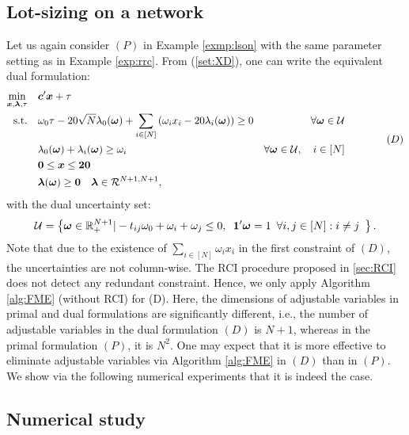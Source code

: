 \documentclass[fleqn,orsc,blindrev]{informs4}
\newcommand{\mb}[1]{\mbox{\boldmath \ensuremath{#1}}}
\begin{document}
		\subsection{Lot-sizing on a network} \label{sec:lsonproblem}
		
		Let us again consider $(P)$ in Example \ref{exmp:lson} with the same parameter setting as in Example \ref{exp:rrc}. From (\ref{set:XD}), one can write the equivalent dual formulation:
\begin{equation*}%
			\begin{aligned} 
				\min_{ \boldsymbol{x} ,\boldsymbol{\lambda}, \tau} \quad &  \mb{c}'\mb{x} + \tau \\
				{\rm s.t.}  \quad & \omega_0\tau - 20\sqrt{N}\lambda_0(\mb{\omega}) + \sum_{i\in [N]}  \left(  \omega_i x_i - 20\lambda_i(\mb{\omega})  \right)  \ge 0   & \forall \mb{\omega} \in \mathcal{U} \\
				\quad & \lambda_0(\mb{\omega}) + \lambda_i (\mb{\omega})\ge \omega_i & \forall \mb{\omega} \in \mathcal{U}, \quad i \in [N]\\
				\quad &   \mb{0}\le \mb{x} \le \mb{20}\\
				\quad & \boldsymbol{\lambda}(\mb{\omega}) \ge \mb{0}	\quad  \mb{\lambda} \in \mathcal{R}^{N+1,N+1},
			\end{aligned} \qquad \qquad (D)
\end{equation*}
		with the dual uncertainty set:
\begin{equation*}
		\mathcal{U}=\left\{ \mb{\omega} \in \mathbb{R}^{N+1}_+| -t_{ij}\omega_0 + \omega_i + \omega_j \le 0, \,\,\, \boldsymbol{1}'\boldsymbol{\omega} = 1 \,\,\, \forall i,j \in [N]: i\ne j \,\,\, \right\}.
\end{equation*}
		Note that due to the existence of  $\sum_{i\in [N]} \omega_i x_i$ in the first constraint of $(D)$, the uncertainties are not column-wise. The RCI procedure proposed in \textsection \ref{sec:RCI} does not detect any redundant constraint. Hence, we only apply Algorithm \ref{alg:FME} (without RCI) for (D). Here, the dimensions of adjustable variables in primal and dual formulations are significantly different, i.e., the number of adjustable variables in the dual formulation $(D)$ is $N+1$, whereas in the primal formulation $(P)$, it is $N^2$. One may expect that it is more effective to eliminate adjustable variables via Algorithm \ref{alg:FME} in $(D)$ than in  $(P)$. We show via the following numerical experiments that it is indeed the case.
		
		\subsection*{Numerical study}
	
\end{document}
